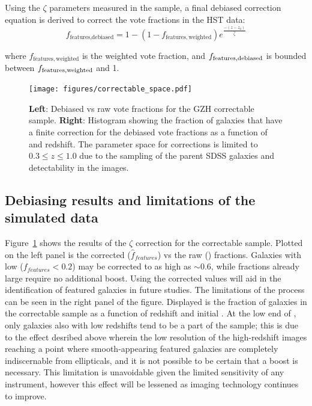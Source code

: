 Using the $\zeta$ parameters measured in the \ferengi{} sample, a final debiased correction equation is derived to correct the \ffeatures{} vote fractions in the HST data:
\begin{equation}
f_\textrm{features,debiased} = 1 - (1 - f_\mathrm{features,weighted})e^{\frac{-(z-z_0)}{\hat\zeta}}
\label{eqn:fzeta_mod}
\end{equation}

\noindent where $f_\mathrm{features,weighted}$ is the weighted vote fraction, and $f_{\rm features,debiased}$ is bounded 
between $f_{\rm features,weighted}$ and 1. 

\begin{figure}
\center
\texttt{[image: figures/correctable\_space.pdf]}
\caption{\textbf{Left}: Debiased vs raw vote fractions for the GZH correctable sample. \textbf{Right}: Histogram showing the fraction of galaxies that have a finite correction for the debiased vote fractions \ffeaturesdebiased{} as a function of \ffeatures{}
and redshift. The parameter space for corrections is limited to $0.3 \leq z \leq 1.0$
due to the sampling of the parent SDSS galaxies and detectability in the \ferengi{} images.
}
\label{fig:correctable_fraction}
\end{figure}



\subsection{Debiasing results and limitations of the \ferengi{} simulated data}
Figure~\ref{fig:correctable_fraction} shows the results of the $\zeta$ correction for the correctable sample. Plotted on the left panel is the corrected ($\hat f_{features}$) vs the raw (\ffeatures{}) fractions. Galaxies with low ($ f_{features} < 0.2$) may be corrected to as high as $\sim 0.6$, while fractions already large require no additional boost. Using the corrected values will aid in the identification of featured galaxies in future studies. The limitations of the process can be seen in the right panel of the figure. Displayed is the fraction of galaxies in the correctable sample as a function of redshift and initial \ffeatures{}. At the low end of \ffeatures{}, only galaxies also with low redshifts tend to be a part of the sample; this is due to the effect desribed above wherein the low resolution of the high-redshift images reaching a point where smooth-appearing featured galaxies are completely indiscernable from ellipticals, and it is not possible to be certain that a boost is necessary. This limitation is unavoidable given the limited sensitivity of any instrument, however this effect will be lessened as imaging technology continues to improve. 

